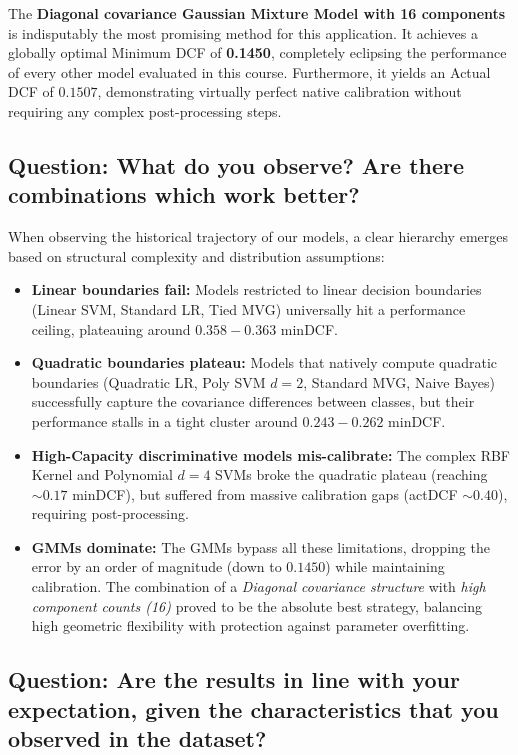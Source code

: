 The \textbf{Diagonal covariance Gaussian Mixture Model with 16 components} is indisputably the most promising method for this application. It achieves a globally optimal Minimum DCF of \textbf{0.1450}, completely eclipsing the performance of every other model evaluated in this course. Furthermore, it yields an Actual DCF of $0.1507$, demonstrating virtually perfect native calibration without requiring any complex post-processing steps.

\subsection*{Question: What do you observe? Are there combinations which work better?}

When observing the historical trajectory of our models, a clear hierarchy emerges based on structural complexity and distribution assumptions:
\begin{itemize}
    \item \textbf{Linear boundaries fail:} Models restricted to linear decision boundaries (Linear SVM, Standard LR, Tied MVG) universally hit a performance ceiling, plateauing around $0.358 - 0.363$ minDCF.
    \item \textbf{Quadratic boundaries plateau:} Models that natively compute quadratic boundaries (Quadratic LR, Poly SVM $d=2$, Standard MVG, Naive Bayes) successfully capture the covariance differences between classes, but their performance stalls in a tight cluster around $0.243 - 0.262$ minDCF. 
    \item \textbf{High-Capacity discriminative models mis-calibrate:} The complex RBF Kernel and Polynomial $d=4$ SVMs broke the quadratic plateau (reaching $\sim 0.17$ minDCF), but suffered from massive calibration gaps (actDCF $\sim 0.40$), requiring post-processing.
    \item \textbf{GMMs dominate:} The GMMs bypass all these limitations, dropping the error by an order of magnitude (down to $0.1450$) while maintaining calibration. The combination of a \textit{Diagonal covariance structure} with \textit{high component counts (16)} proved to be the absolute best strategy, balancing high geometric flexibility with protection against parameter overfitting.
\end{itemize}

\subsection*{Question: Are the results in line with your expectation, given the characteristics that you observed in the dataset?}

